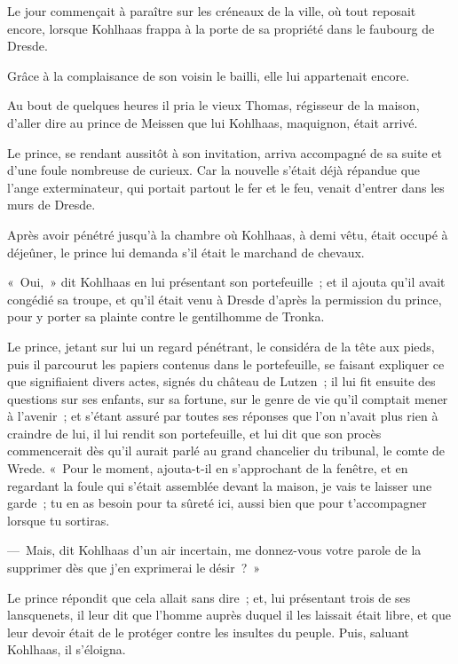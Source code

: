 \documentclass[french,twoside]{book} %
\newcommand\chaptercont{} %
\begin{document}
\chaptercont
\noindent Le jour commençait à paraître sur les créneaux de la ville, où tout reposait encore, lorsque Kohlhaas frappa à la porte de sa propriété dans le faubourg de Dresde.\par
Grâce à la complaisance de son voisin le bailli, elle lui appartenait encore.\par
Au bout de quelques heures il pria le vieux Thomas, régisseur de la maison, d’aller dire au prince de Meissen que lui Kohlhaas, maquignon, était arrivé.\par
Le prince, se rendant aussitôt à son invitation, arriva accompagné de sa suite et d’une foule nombreuse de curieux. Car la nouvelle s’était déjà répandue que l’ange exterminateur, qui portait partout le fer et le feu, venait d’entrer dans les murs de Dresde.\par
Après avoir pénétré jusqu’à la chambre où Kohlhaas, à demi vêtu, était occupé à déjeûner, le prince lui demanda s’il était le marchand de chevaux.\par
« Oui, » dit Kohlhaas en lui présentant son portefeuille ; et il ajouta qu’il avait congédié sa troupe, et qu’il était venu à Dresde d’après la permission du prince, pour y porter sa plainte contre le gentilhomme de Tronka.\par
Le prince, jetant sur lui un regard pénétrant, le considéra de la tête aux pieds, puis il parcourut les papiers contenus dans le portefeuille, se faisant expliquer ce que signifiaient divers actes, signés du château de Lutzen ; il lui fit ensuite des questions sur ses enfants, sur sa fortune, sur le genre de vie qu’il comptait mener à l’avenir ; et s’étant assuré par toutes ses réponses que l’on n’avait plus rien à craindre de lui, il lui rendit son portefeuille, et lui dit que son procès commencerait dès qu’il aurait parlé au grand chancelier du tribunal, le comte de Wrede. « Pour le moment, ajouta-t-il en s’approchant de la fenêtre, et en regardant la foule qui s’était assemblée devant la maison, je vais te laisser une garde ; tu en as besoin pour ta sûreté ici, aussi bien que pour t’accompagner lorsque tu sortiras.\par
— Mais, dit Kohlhaas d’un air incertain, me donnez-vous votre parole de la supprimer dès que j’en exprimerai le désir ? »\par
Le prince répondit que cela allait sans dire ; et, lui présentant trois de ses lansquenets, il leur dit que l’homme auprès duquel il les laissait était libre, et que leur devoir était de le protéger contre les insultes du peuple. Puis, saluant Kohlhaas, il s’éloigna.\par
\end{document}
